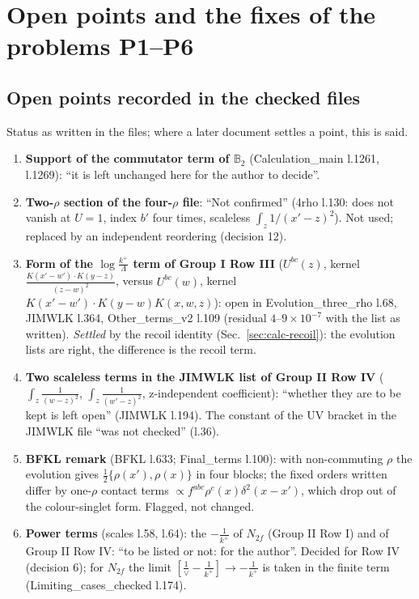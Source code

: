 \documentclass[10pt]{article}
\def\mf#1{\mathbb{#1}}
\begin{document}
\section{Open points and the fixes of the problems P1--P6}\label{sec:open}

\subsection{Open points recorded in the checked files}
\noindent Status as written in the files; where a later document settles a point, this is said.
\begin{enumerate}
\item \textbf{Support of the commutator term of $\mf{B}_{2}$} (Calculation\_main l.1261, l.1269): ``it is left unchanged here for the author to decide''.
\item \textbf{Two-$\rho$ section of the four-$\rho$ file}: ``Not confirmed'' (4rho l.130: does not vanish at $U=1$, index $b'$ four times, scaleless $\int_{z}1/(x'-z)^{2}$). Not used; replaced by an independent reordering (decision 12).
\item \textbf{Form of the $\log\frac{k^{+}}{\Lambda}$ term of Group I Row III} ($U^{bc}(z)$, kernel $\frac{K(x'-w')\cdot K(y-z)}{(z-w)^{2}}$, versus $U^{bc}(w)$, kernel $K(x'-w')\cdot K(y-w)K(x,w,z)$): open in Evolution\_three\_rho l.68, JIMWLK l.364, Other\_terms\_v2 l.109 (residual $4$--$9\times10^{-7}$ with the list as written). \emph{Settled} by the recoil identity (Sec.~\ref{sec:calc-recoil}): the evolution lists are right, the difference is the recoil term.
\item \textbf{Two scaleless terms in the JIMWLK list of Group II Row IV} ($\int_{z}\frac{1}{(w-z)^{2}}$, $\int_{z}\frac{1}{(w'-z)^{2}}$, z-independent coefficient): ``whether they are to be kept is left open'' (JIMWLK l.194). The constant of the UV bracket in the JIMWLK file ``was not checked'' (l.36).
\item \textbf{BFKL remark} (BFKL l.633; Final\_terms l.100): with non-commuting $\rho$ the evolution gives $\frac12\{\rho(x'),\rho(x)\}$ in four blocks; the fixed orders written differ by one-$\rho$ contact terms $\propto f^{abc}\rho^{c}(x)\delta^{2}(x-x')$, which drop out of the colour-singlet form. Flagged, not changed.
\item \textbf{Power terms} (scales l.58, l.64): the $-\frac{1}{k^{+}}$ of $N_{2f}$ (Group II Row I) and of Group II Row IV: ``to be listed or not: for the author''. Decided for Row IV (decision 6); for $N_{2f}$ the limit $[\frac1\vee-\frac{1}{k^{+}}]\to-\frac{1}{k^{+}}$ is taken in the finite term (Limiting\_cases\_checked l.174).

\end{enumerate}
\end{document}
